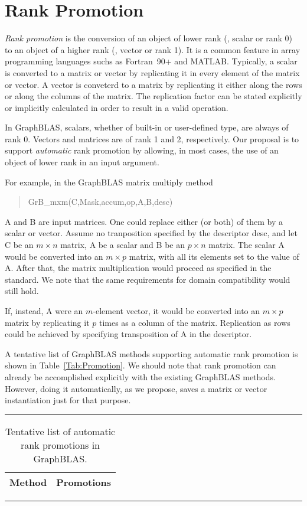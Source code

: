 \section{Rank Promotion}
\label{Sec:promotion}

\emph{Rank promotion} is the conversion of an object of lower rank (\eg,
scalar or rank 0) to an object of a higher rank (\eg, vector or rank 1).
It is a common feature in array programming languages suchs as Fortran~90+
and MATLAB.  Typically, a scalar is converted to a matrix or vector
by replicating it in every element of the matrix or vector. A vector is
conveterd to a matrix by replicating it either along the rows or along the
columns of the matrix.  The replication factor can be stated explicitly
or implicitly calculated in order to result in a valid operation.

In GraphBLAS, scalars, whether of built-in or user-defined type, are
always of rank 0. Vectors and matrices are of rank 1 and 2, respectively.
Our proposal is to support \emph{automatic} rank promotion by allowing,
in most cases, the use of an object of lower rank in an input argument.

For example, in the GraphBLAS matrix multiply method 
\begin{quote} 
{\sf GrB\_mxm(C,Mask,accum,op,A,B,desc)}
\end{quote}
{\sf A} and {\sf B} are input matrices. One could replace either (or both)
of them by a scalar or vector.  Assume no tranposition specified by the
descriptor {\sf desc}, and let {\sf C} be an $m \times n$ matrix, {\sf A}
be a scalar and {\sf B} be an $p \times n$ matrix. The scalar {\sf A}
would be converted into an $m \times p$ matrix, with all its elements
set to the value of {\sf A}.  After that, the matrix multiplication would
proceed as specified in the standard.  We note that the same requirements
for domain compatibility would still hold.

If, instead, {\sf A} were an $m$-element vector, it would be converted into
an $m \times p$ matrix by replicating it $p$ times as a column of the matrix.
Replication as rows could be achieved by specifying transposition of
{\sf A} in the descriptor.

A tentative list of GraphBLAS methods supporting automatic rank
promotion is shown in Table~\ref{Tab:Promotion}. We should note that 
rank promotion can already be accomplished explicitly with the existing
GraphBLAS methods. However, doing it automatically, as we propose,
saves a matrix or vector instantiation just for that purpose.

\begin{table}[htb]
	\hrule
	\caption{Tentative list of automatic rank promotions in GraphBLAS.}
	\label{Tab:promotions}
	\begin{center}
		\begin{tabular}{|l|l|} \hline
			Method		& Promotions \\ \hline
		\end{tabular}
	\end{center}
	\hrule
\end{table}

